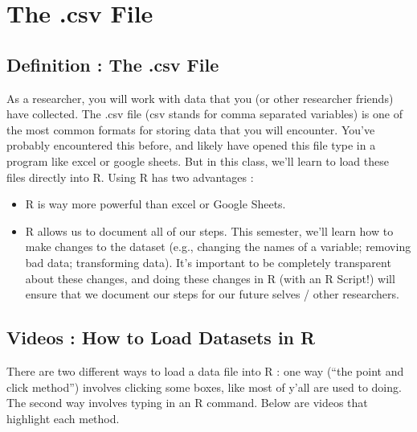 \documentclass[
  letterpaper,
  DIV=11,
  numbers=noendperiod,
  oneside]{scrreprt}
\providecommand{\tightlist}{%
  \setlength{\itemsep}{0pt}\setlength{\parskip}{0pt}}\usepackage{longtable,booktabs,array}
\begin{document}
\section{The .csv File}\label{the-.csv-file}

\subsection{Definition : The .csv File}\label{definition-the-.csv-file}

As a researcher, you will work with data that you (or other researcher
friends) have collected. The .csv file (csv stands for comma separated
variables) is one of the most common formats for storing data that you
will encounter. You've probably encountered this before, and likely have
opened this file type in a program like excel or google sheets. But in
this class, we'll learn to load these files directly into R. Using R has
two advantages :

\begin{itemize}
\tightlist
\item
  R is way more powerful than excel or Google Sheets.
\item
  R allows us to document all of our steps. This semester, we'll learn
  how to make changes to the dataset (e.g., changing the names of a
  variable; removing bad data; transforming data). It's important to be
  completely transparent about these changes, and doing these changes in
  R (with an R Script!) will ensure that we document our steps for our
  future selves / other researchers.
\end{itemize}

\subsection{Videos : How to Load Datasets in
R}\label{videos-how-to-load-datasets-in-r}

There are two different ways to load a data file into R : one way (``the
point and click method'') involves clicking some boxes, like most of
y'all are used to doing. The second way involves typing in an R command.
Below are videos that highlight each method.
\end{document}

